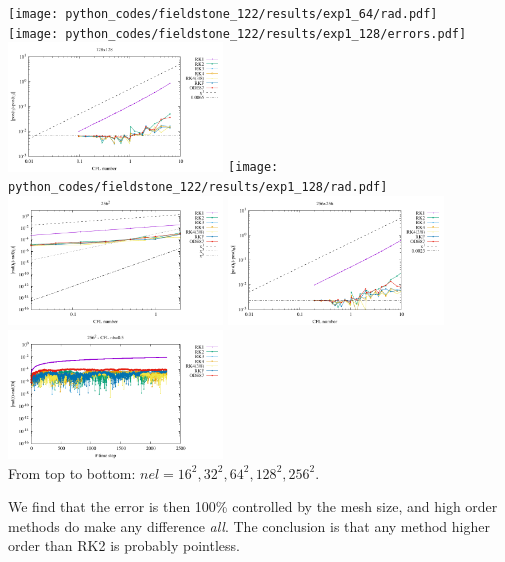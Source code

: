 \begin{center}
\texttt{[image: python\_codes/fieldstone\_122/results/exp1\_64/rad.pdf]}\\
\texttt{[image: python\_codes/fieldstone\_122/results/exp1\_128/errors.pdf]}
\includegraphics[width=5.7cm]{python_codes/fieldstone_122/results/exp1_128/errors2.pdf}
\texttt{[image: python\_codes/fieldstone\_122/results/exp1\_128/rad.pdf]}\\
\includegraphics[width=5.7cm]{python_codes/fieldstone_122/results/exp1_256/errors.pdf}
\includegraphics[width=5.7cm]{python_codes/fieldstone_122/results/exp1_256/errors2.pdf}
\includegraphics[width=5.7cm]{python_codes/fieldstone_122/results/exp1_256/rad.pdf}\\
{\captionfont From top to bottom: $nel=16^2,32^2,64^2,128^2,256^2$.}
\end{center}

We find that the error is then 100\% controlled by the mesh size, and high order methods do 
make any difference {\it all}.
The conclusion is that any method higher order than RK2 is probably pointless. 


\newpage
